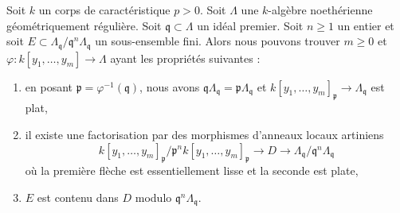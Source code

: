\begin{lemma}
\label{lemma-solution-modulo}
Soit $k$ un corps de caractéristique $p > 0$.
Soit $\Lambda$ une $k$-algèbre noethérienne géométriquement régulière.
Soit $\mathfrak q \subset \Lambda$ un idéal premier.
Soit $n \geq 1$ un entier et soit
$E \subset \Lambda_\mathfrak q/\mathfrak q^n\Lambda_\mathfrak q$
un sous-ensemble fini.
Alors nous pouvons trouver $m \geq 0$ et
$\varphi : k[y_1, \ldots, y_m] \to \Lambda$ ayant les propriétés suivantes :
\begin{enumerate}
\item en posant $\mathfrak p = \varphi^{-1}(\mathfrak q)$, nous avons
$\mathfrak q\Lambda_\mathfrak q = \mathfrak p \Lambda_\mathfrak q$
et $k[y_1, \ldots, y_m]_\mathfrak p \to \Lambda_\mathfrak q$ est plat,
\item il existe une factorisation par des morphismes d'anneaux locaux artiniens
$$
k[y_1, \ldots, y_m]_\mathfrak p/\mathfrak p^n k[y_1, \ldots, y_m]_\mathfrak p
\to D \to
\Lambda_\mathfrak q/\mathfrak q^n\Lambda_\mathfrak q
$$
où la première flèche est essentiellement lisse et la seconde est plate,
\item $E$ est contenu dans $D$ modulo $\mathfrak q^n\Lambda_\mathfrak q$.
\end{enumerate}
\end{lemma}

